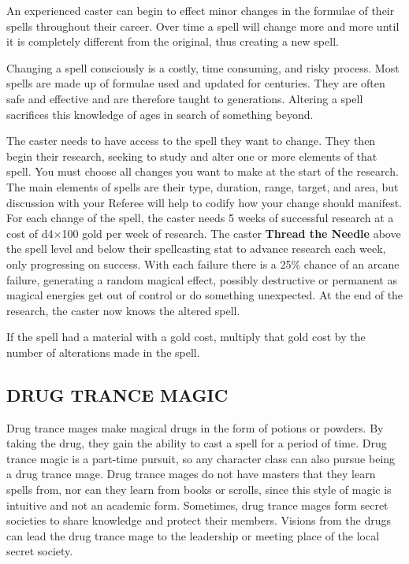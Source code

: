 \documentclass[twoside]{article}
\newcommand{\TTN}[2]{\textbf{Thread the Needle} above #1 and below #2}
\begin{document}
An experienced caster can begin to effect minor changes in the formulae of their spells throughout their career. Over time a spell will change more and more until it is completely different from the original, thus creating a new spell.

\bigbreak

Changing a spell consciously is a costly, time consuming, and risky process. Most spells are made up of formulae used and updated for centuries. They are often safe and effective and are therefore taught to generations. Altering a spell sacrifices this knowledge of ages in search of something beyond. 

\bigbreak

The caster needs to have access to the spell they want to change. They then begin their research, seeking to study and alter one or more elements of that spell. You must choose all changes you want to make at the start of the research. The main elements of spells are their type, duration, range, target, and area, but discussion with your Referee will help to codify how your change should manifest. For each change of the spell, the caster needs 5 weeks of successful research at a cost of d4$\times$100 gold per week of research. The caster \TTN{the spell level}{their spellcasting stat} to advance research each week, only progressing on success. With each failure there is a 25\% chance of an arcane failure, generating a random magical effect, possibly destructive or permanent as magical energies get out of control or do something unexpected. At the end of the research, the caster now knows the altered spell.

\bigbreak

If the spell had a material with a gold cost, multiply that gold cost by the number of alterations made in the spell.

\subsection*{\footnotesize{D}\scriptsize{RUG} \footnotesize{T}\scriptsize{RANCE} \footnotesize{M}\scriptsize{AGIC}\normalsize}

Drug trance mages make magical drugs in the form of potions or powders. By taking the drug, they gain the ability to cast a spell for a period of time. Drug trance magic is a part-time pursuit, so any character class can also pursue being a drug trance mage. Drug trance mages do not have masters that they learn spells from, nor can they learn from books or scrolls, since this style of magic is intuitive and not an academic form. Sometimes, drug trance mages form secret societies to share knowledge and protect their members. Visions from the drugs can lead the drug trance mage to the leadership or meeting place of the local secret society.
\end{document}
